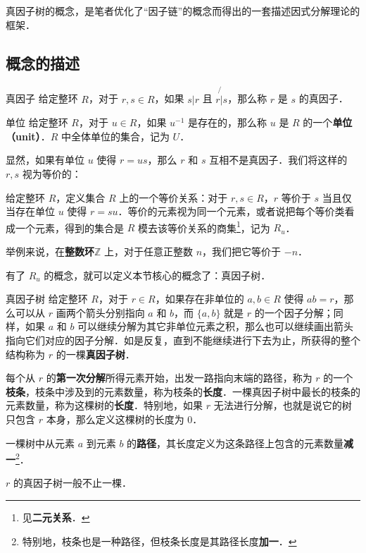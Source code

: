 

真因子树的概念，是笔者优化了“因子链”的概念而得出的一套描述因式分解理论的框架．

\subsection{概念的描述}

\begin{definition}{真因子}
给定整环 $R$，对于 $r, s\in R$，如果 $s|r$ 且 $r\not{|}s$，那么称 $r$ 是 $s$ 的真因子．
\end{definition}

\begin{definition}{单位}
给定整环 $R$，对于 $u\in R$，如果 $u^{-1}$ 是存在的，那么称 $u$ 是 $R$ 的一个\textbf{单位（unit）}．$R$ 中全体单位的集合，记为 $U$．
\end{definition}

显然，如果有单位 $u$ 使得 $r=us$，那么 $r$ 和 $s$ 互相不是真因子．我们将这样的 $r, s$ 视为等价的：

\begin{definition}{}\label{FctTre_def2}
给定整环 $R$，定义集合 $R$ 上的一个等价关系：对于 $r, s\in R$，$r$ 等价于 $s$ 当且仅当存在单位 $u$ 使得 $r=su$．等价的元素视为同一个元素，或者说把每个等价类看成一个元素，得到的集合是 $R$ 模去该等价关系的商集\footnote{见\textbf{二元关系}．}，记为 $R_u$．
\end{definition}

举例来说，在\textbf{整数环}$\mathbb{Z}$ 上，对于任意正整数 $n$，我们把它等价于 $-n$．


有了 $R_u$ 的概念，就可以定义本节核心的概念了：真因子树．

\begin{definition}{真因子树}
给定整环 $R$，对于 $r\in R$，如果存在非单位的 $a, b\in R$ 使得 $ab=r$，那么可以从 $r$ 画两个箭头分别指向 $a$ 和 $b$，而 $\{a, b\}$ 就是 $r$ 的一个因子分解；同样，如果 $a$ 和 $b$ 可以继续分解为其它非单位元素之积，那么也可以继续画出箭头指向它们对应的因子分解．如是反复，直到不能继续进行下去为止，所获得的整个结构称为 $r$ 的一棵\textbf{真因子树}．

每个从 $r$ 的\textbf{第一次分解}所得元素开始，出发一路指向末端的路径，称为 $r$ 的一个\textbf{枝条}，枝条中涉及到的元素数量，称为枝条的\textbf{长度}．一棵真因子树中最长的枝条的元素数量，称为这棵树的\textbf{长度}．特别地，如果 $r$ 无法进行分解，也就是说它的树只包含 $r$ 本身，那么定义这棵树的长度为 $0$．

一棵树中从元素 $a$ 到元素 $b$ 的\textbf{路径}，其长度定义为这条路径上包含的元素数量\textbf{减一}\footnote{特别地，枝条也是一种路径，但枝条长度是其路径长度\textbf{加一}．}．

$r$ 的真因子树一般不止一棵．
\end{definition}

